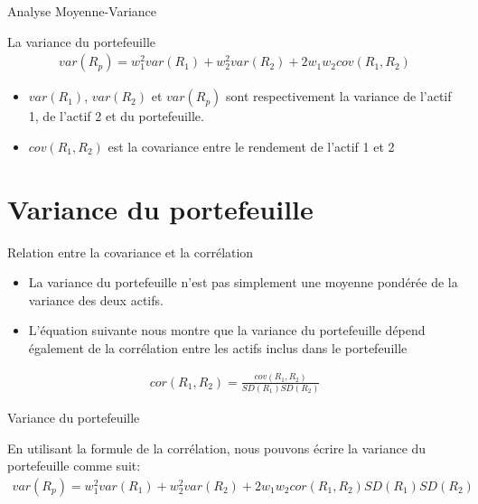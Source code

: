 \documentclass{beamer}
\begin{document}
\begin{frame}{Analyse Moyenne-Variance}
\begin{block}{La variance du portefeuille}
\begin{align*}
var(R_p) = w_1^2 var(R_1) + w_2^2 var(R_2) + 2 w_1 w_2 cov(R_1, R_2)
\end{align*}
\end{block}
\vspace{0.5cm}
\begin{itemize}[label=\bullet]
\item $var(R_1)$, $var(R_2)$ et $var(R_p)$ sont respectivement la variance de l'actif 1, de l'actif 2 et du portefeuille.
\item $cov(R_1, R_2)$ est la covariance entre le rendement de l'actif 1 et 2
\end{itemize}
\end{frame}


\section{Variance du portefeuille}

\begin{frame}{Relation entre la covariance et la corrélation}
\begin{itemize}[label=\bullet]
\item La variance du portefeuille n'est pas simplement une moyenne pondérée de la variance des deux actifs.
\item L’équation suivante nous montre que la variance du portefeuille dépend également de la corrélation entre les actifs inclus dans le portefeuille 
\end{itemize}
\begin{align*}
cor(R_1,R_2)=\frac{cov(R_1,R_2)}{SD(R_1)SD(R_2)}
\end{align*}
\end{frame}

\begin{frame}{Variance du portefeuille}

En utilisant la formule de la corrélation, nous pouvons écrire la variance du portefeuille comme suit:
\vspace{0.5cm}
\begin{align*}
var(R_p) = w_1^2 var(R_1) + w_2^2 var(R_2) + 2 w_1 w_2 cor(R_1,R_2)SD(R_1)SD(R_2)
\end{align*}
\end{frame}
\end{document}
